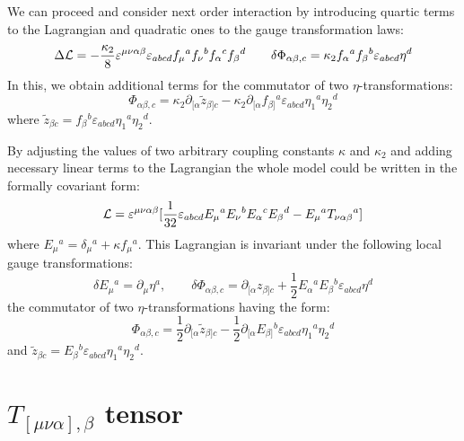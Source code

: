 \documentclass[a4paper,12pt]{article}
\begin{document}
We can proceed and consider next order interaction by introducing
quartic terms to the Lagrangian and quadratic ones to the gauge
transformation laws:
\begin{equation}
\Delta {\cal L} = - \frac{\kappa_2}{8} \varepsilon^{\mu\nu\alpha\beta}
\varepsilon_{abcd} f_\mu{}^a f_\nu{}^b f_\alpha{}^c f_\beta{}^d \qquad
\delta \Phi_{\alpha\beta,c} = \kappa_2 f_\alpha{}^a f_\beta{}^b
\varepsilon_{abcd} \eta^d
\end{equation}
In this, we obtain additional terms for the commutator of two
$\eta$-transformations:
\begin{equation}
[\delta_1, \delta_2] \Phi_{\alpha\beta,c} = \kappa_2
\partial_{[\alpha} \tilde{z}_{\beta]c} - \kappa_2 \partial_{[\alpha}
f_{\beta]}{}^a \varepsilon_{abcd} \eta_1{}^a \eta_2{}^d
\end{equation}
where $\tilde{z}_{\beta c} = f_\beta{}^b \varepsilon_{abcd}
\eta_1{}^a \eta_2{}^d$.

By adjusting the values of two arbitrary coupling constants $\kappa$
and $\kappa_2$ and adding necessary linear terms to the Lagrangian the
whole model could be written in the formally covariant form:
\begin{equation}
{\cal L} = \varepsilon^{\mu\nu\alpha\beta} [ \frac{1}{32}
\varepsilon_{abcd} E_\mu{}^a E_\nu{}^b E_\alpha{}^c E_\beta{}^d -
E_\mu{}^a T_{\nu\alpha\beta}{}^a ]
\end{equation}
where $E_\mu{}^a = \delta_\mu{}^a + \kappa f_\mu{}^a$. This Lagrangian
is invariant under the following local gauge transformations:
\begin{equation}
\delta E_\mu{}^a = \partial_\mu \eta^a, \qquad \delta
\Phi_{\alpha\beta,c} = \partial_{[\alpha} z_{\beta]c} + \frac{1}{2}
E_\alpha{}^a E_\beta{}^b \varepsilon_{abcd} \eta^d
\end{equation}
the commutator of two $\eta$-transformations having the form:
\begin{equation}
[\delta_1, \delta_2] \Phi_{\alpha\beta,c} = \frac{1}{2}
\partial_{[\alpha} \tilde{z}_{\beta]c} - \frac{1}{2}
\partial_{[\alpha} E_{\beta]}{}^b \varepsilon_{abcd} \eta_1{}^a
\eta_2{}^d
\end{equation}
and $\tilde{z}_{\beta c} = E_\beta{}^b \varepsilon_{abcd}
\eta_1{}^a \eta_2{}^d$.


\section{$T_{[\mu\nu\alpha],\beta}$ tensor}
\end{document}
